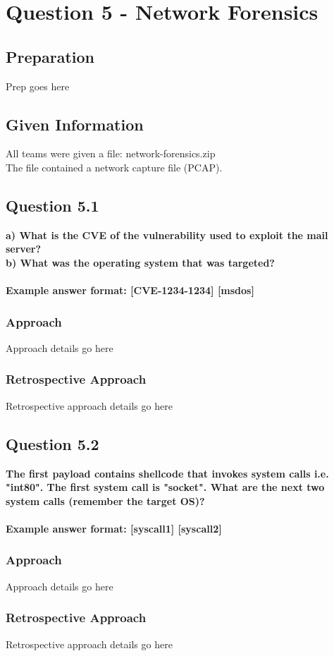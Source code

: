 \chapter{Question 5 - Network Forensics}

\section{Preparation}
Prep goes here

\section{Given Information}
All teams were given a file: network-forensics.zip\\
The file contained a network capture file (PCAP).

\section{Question 5.1}
\textbf{a) What is the CVE of the vulnerability used to exploit the mail server?
\\b) What was the operating system that was targeted?
\\\\
Example answer format: [CVE-1234-1234] [msdos]}
\subsection{Approach}
Approach details go here
\subsection{Retrospective Approach}
Retrospective approach details go here

\section{Question 5.2}
\textbf{The first payload contains shellcode that invokes system calls i.e.
"int80". The first system call is "socket". What are the next two system calls
(remember the target OS)?
\\\\
Example answer format: [syscall1] [syscall2]}
\subsection{Approach}
Approach details go here
\subsection{Retrospective Approach}
Retrospective approach details go here

